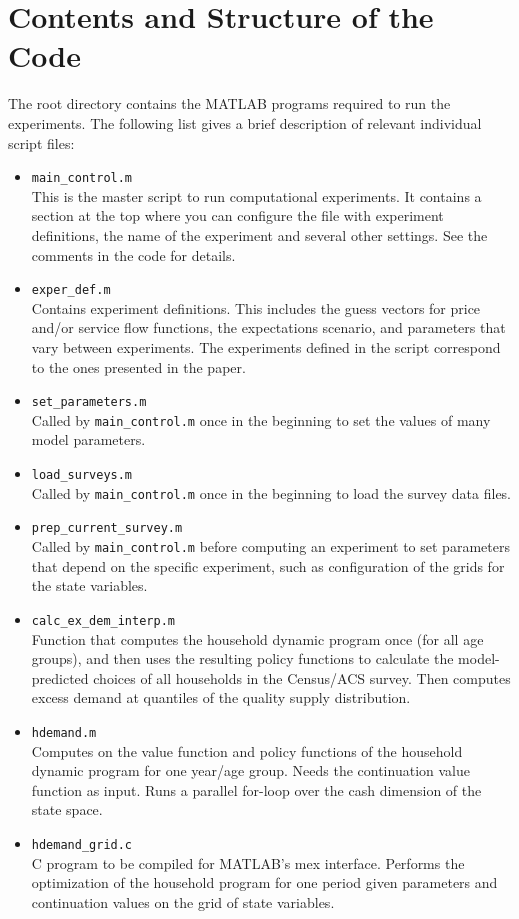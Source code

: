\documentclass[letterpaper,12pt]{article}
\begin{document}
\section{Contents and Structure of the Code}

The root directory contains the MATLAB programs required to run the experiments. The following list gives a brief description of relevant individual script files:
\begin{itemize}
	\item \verb|main_control.m|\\
		  This is the master script to run computational experiments. It contains a section at the top where you can configure the file with experiment definitions, the name of the experiment and several other settings. See the comments in the code for details.
	\item \verb|exper_def.m|\\
		  Contains experiment definitions. This includes the guess vectors for price and/or service flow functions, the expectations scenario, and parameters that vary between experiments. The experiments defined in the script correspond to the ones presented in the paper.
	\item \verb|set_parameters.m|\\
		  Called by \verb|main_control.m| once in the beginning to set the values of many model parameters.
	\item \verb|load_surveys.m|\\
		  Called by \verb|main_control.m| once in the beginning to load the survey data files.
	\item \verb|prep_current_survey.m|\\
	      Called by \verb|main_control.m| before computing an experiment to set parameters that depend on the specific experiment, such as configuration of the grids for the state variables.
	\item \verb|calc_ex_dem_interp.m|\\
		  Function that computes the household dynamic program once (for all age groups), and then uses the resulting policy functions to calculate the model-predicted choices of all households in the Census/ACS survey. Then computes excess demand at quantiles of the quality supply distribution.
	\item \verb|hdemand.m|\\
		  Computes on the value function and policy functions of the household dynamic program for one year/age group. Needs the continuation value function as input. Runs a parallel for-loop over the cash dimension of the state space.
	\item \verb|hdemand_grid.c|\\
	      C program to be compiled for MATLAB's mex interface. Performs the optimization of the household program for one period given parameters and continuation values on the grid of state variables.		  
\end{itemize}
\end{document}
